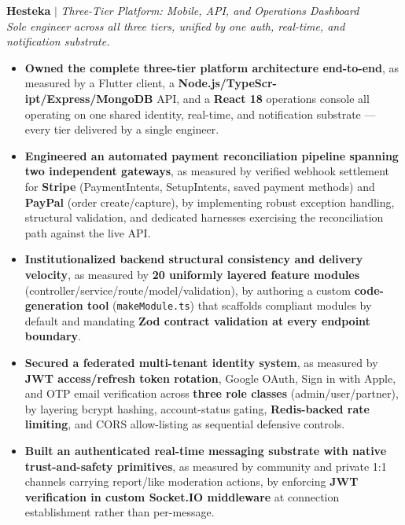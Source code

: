 \documentclass[10pt,letterpaper]{article}
\newenvironment{highlights}{
  \begin{itemize}[topsep=2pt,parsep=1pt,partopsep=0pt,itemsep=0pt,leftmargin=10pt]
}{\end{itemize}}
\begin{document}
\textbf{Hesteka} $|$ \textit{Three-Tier Platform: Mobile, API, and Operations Dashboard}
\hfill
\href{https://play.google.com/store/apps/details?id=com.emmafve.app}{\textcolor{myblue}{\faGooglePlay}}
\href{https://apps.apple.com/fr/app/hesteka/id6777662331}{\textcolor{myblue}{\faAppStore}}
\href{https://github.com/H-Yeasin/findanimalApp}{\textcolor{myblue}{\faGithub}}\\
\textit{Sole engineer across all three tiers, unified by one auth, real-time, and notification substrate.}
\begin{highlights}
  \item \textbf{Owned the complete three-tier platform architecture end-to-end}, as measured by a Flutter client, a \textbf{Node.js/TypeScr-ipt/Express/MongoDB} API, and a \textbf{React 18} operations console all operating on one shared identity, real-time, and notification substrate — every tier delivered by a single engineer.
  \item \textbf{Engineered an automated payment reconciliation pipeline spanning two independent gateways}, as measured by verified webhook settlement for \textbf{Stripe} (PaymentIntents, SetupIntents, saved payment methods) and \textbf{PayPal} (order create/capture), by implementing robust exception handling, structural validation, and dedicated harnesses exercising the reconciliation path against the live API.
  \item \textbf{Institutionalized backend structural consistency and delivery velocity}, as measured by \textbf{20 uniformly layered feature modules} (controller/service/route/model/validation), by authoring a custom \textbf{code-generation tool} (\texttt{makeModule.ts}) that scaffolds compliant modules by default and mandating \textbf{Zod contract validation at every endpoint boundary}.
  \item \textbf{Secured a federated multi-tenant identity system}, as measured by \textbf{JWT access/refresh token rotation}, Google OAuth, Sign in with Apple, and OTP email verification across \textbf{three role classes} (admin/user/partner), by layering bcrypt hashing, account-status gating, \textbf{Redis-backed rate limiting}, and CORS allow-listing as sequential defensive controls.
  \item \textbf{Built an authenticated real-time messaging substrate with native trust-and-safety primitives}, as measured by community and private 1:1 channels carrying report/like moderation actions, by enforcing \textbf{JWT verification in custom Socket.IO middleware} at connection establishment rather than per-message.

\end{highlights}
\end{document}
